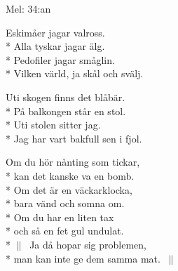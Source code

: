 \begin{SongText}[Bakfyllosofen]
    \begin{SongInfo}
        Mel: 34:an
    \end{SongInfo}
    \begin{SongVerse}
        Eskimåer jagar valross.\\*%
        Alla tyskar jagar älg.\\*%
        Pedofiler jagar småglin.\\*%
        Vilken värld, ja skål och svälj.
    \end{SongVerse}
    \begin{SongVerse}
        Uti skogen finns det blåbär.\\*%
        På balkongen står en stol.\\*%
        Uti stolen sitter jag.\\*%
        Jag har vart bakfull sen i fjol.
    \end{SongVerse}
    \begin{SongVerse}
        Om du hör nånting som tickar,\\*%
        kan det kanske va en bomb.\\*%
        Om det är en väckarklocka,\\*%
        bara vänd och somna om.\\*%
        Om du har en liten tax\\*%
        och så en fet gul undulat.\\*%
        $\|\:$ Ja då hopar sig problemen,\\*%
        man kan inte ge dem samma mat. $\:\|$
    \end{SongVerse}
\end{SongText}
